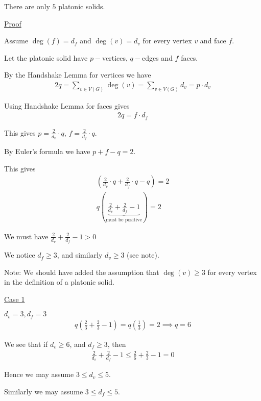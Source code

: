 \documentclass{article}
\begin{document}
There are only $5$ platonic solids. 

\underline{Proof}

Assume $\deg(f) = d_f$ and $\deg(v) = d_v$ for every vertex $v$ and face $f$. 

Let the platonic solid have $p-$vertices, $q-$edges and $f$ faces. 

By the Handshake Lemma for vertices we have
\begin{align*}
    2q = \sum_{v \in V(G)}\deg(v) = \sum_{v \in V(G)} d_v = p \cdot d_v
\end{align*}

Using Handshake Lemma for faces gives
\begin{align*}
    2q = f \cdot d_f
\end{align*}

This gives $p = \frac{2}{d_v} \cdot q$, $f = \frac{2}{d_f} \cdot q$. 

By Euler's formula we have $p + f - q = 2$.

This gives
\begin{align*}
    \left ( \frac{2}{d_v} \cdot q + \frac{2}{d_f} \cdot q - q \right ) = 2 \\
    q \left ( \underbrace{\frac{2}{d_v} + \frac{2}{d_f} - 1}_{\text{must be positive}} \right ) = 2
\end{align*}

We must have $\frac{2}{d_v} + \frac{2}{d_f} - 1 > 0$

We notice $d_f \ge 3$, and similarly $d_v \ge 3$ (see note).

Note: We should have added the assumption that $\deg(v) \ge 3$ for every vertex in the definition of a platonic solid. 

\underline{Case 1} 

$d_v = 3, d_f = 3$
\begin{align*}
    q \left ( \frac{2}{3} + \frac{2}{3} - 1 \right ) = q \left ( \frac{1}{3} \right ) = 2 \implies q = 6
\end{align*}

We see that if $d_v \ge 6$, and $d_f \ge 3$, then
\begin{align*}
    \frac{2}{d_v} + \frac{2}{d_f} - 1 \le \frac{2}{6} + \frac{2}{3} - 1 = 0
\end{align*}

Hence we may assume $3 \le d_v \le 5$.

Similarly we may assume $3 \le d_f \le 5$. 
\end{document}
